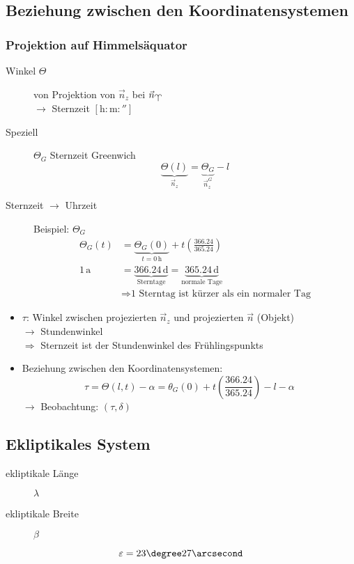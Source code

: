 \subsection{Beziehung zwischen den Koordinatensystemen}
\subsubsection{Projektion auf Himmelsäquator}
\begin{description}
    \item[Winkel $\Theta$] von Projektion von $\vec n_z$ bei $\vec n_{\vernal}$ \\
        $\rightarrow$ Sternzeit $[ \mathrm{h} : \mathrm{m} : \second ]$
    \item[Speziell] $\Theta_G$ Sternzeit Greenwich
        \[ \underbrace{\Theta(l)}_{\vec n_z} = \underbrace{\Theta_G}_{\vec n_z^G} - l \]
    \item[Sternzeit $\rightarrow$ Uhrzeit] Beispiel: $\Theta_G$
        \begin{align*}
            \Theta_G(t) &= \underbrace{\Theta_G(0)}_{t = 0\,\mathrm{h}} + t\left(\frac{366.24}{365.24}\right) \\
            1\,\mathrm{a} &= \underbrace{366.24\,\mathrm{d}}_{\text{Sterntage}} = \underbrace{365.24\,\mathrm{d}}_{\text{normale Tage}} \\
                          &\Rightarrow \text{1 Sterntag ist kürzer als ein normaler Tag}
        \end{align*}
\end{description}

\begin{itemize}
    \item $\tau$: Winkel zwischen projezierten $\vec n_z$ und projezierten $\vec n$ (Objekt) \\
        $\rightarrow$ Stundenwinkel\\
        $\Rightarrow$ Sternzeit ist der Stundenwinkel des Frühlingspunkts
    \item Beziehung zwischen den Koordinatensystemen:
        \[ \boxed{\tau = \Theta(l, t) - \alpha = \theta_G(0) + t \left(\frac{366.24}{365.24}\right) - l - \alpha} \]
        $\rightarrow$ Beobachtung: $(\tau, \delta)$
\end{itemize}

\subsection{Ekliptikales System}
\begin{description}
    \item[ekliptikale Länge] $\lambda$
    \item[ekliptikale Breite] $\beta$
\end{description}
\[ \varepsilon = 23\degree 27\arcsecond \]

